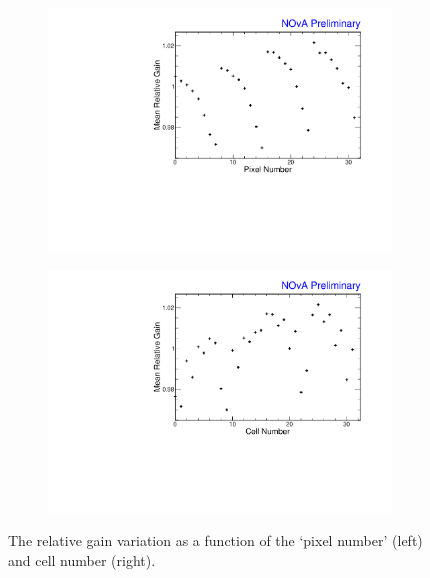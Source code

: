 \begin{figure}[!hbtp]
\centering
\begin{subfigure}[t]{.495\textwidth}
\centering
\includegraphics[width=\textwidth]{Plots/TBCalibration/ReadoutSimulation_GainPixelMap.pdf}
\end{subfigure}
\begin{subfigure}[t]{.495\textwidth}
\centering
\includegraphics[width=\textwidth]{Plots/TBCalibration/ReadoutSimulation_GainCellMap.pdf}
\end{subfigure}
\caption{The relative gain variation as a function of the `pixel number' (left) and cell number (right).}
\label{fig:TBThresholdCorrectionGainMap}
\end{figure}

